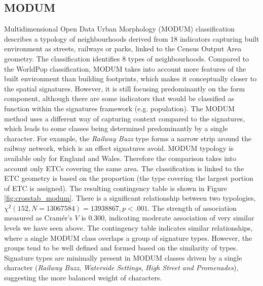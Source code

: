 \subsection*{MODUM}
Multidimensional Open Data Urban Morphology (MODUM) classification describes a typology
of neighbourhoods derived from 18 indicators capturing built environment as streets,
railways or parks, linked to the Census Output Area geometry. The classification
identifies 8 types of neighbourhoods.
Compared to the WorldPop classification, MODUM takes into account more features of
the built environment than building footprints, which makes it conceptually closer to the
spatial signatures. However, it is still focusing predominantly on the form component,
although there are some indicators that would be classified as function within the
signatures framework (e.g. population). The MODUM method uses a different way of
capturing context compared to the signatures, which leads to some classes being
determined predominantly by a single character. For example, the \textit{Railway Buzz} type
forms a narrow strip around the railway network, which is an effect signatures avoid.
MODUM typology is available only for England and Wales. Therefore the comparison takes
into account only ETCs covering the same area. The classification is linked to the
ETC geometry is based on the proportion (the type covering the largest portion of ETC is
assigned). The resulting contingency table is shown in Figure \ref{fig:crosstab_modum}. There is a
significant relationship between two typologies, $\chi^{2} (152, N = 13067584) =
13938867, p < .001$. The strength of association measured as Cramér's $V$ is $0.300$,
indicating moderate association of very similar levels we have seen above. The
contingency table indicates similar relationships, where a single MODUM class overlaps a
group of signature types. However, the groups tend to be well defined and formed based
on the similarity of types. Signature types are minimally present in MODUM classes driven
by a single character (\textit{Railway Buzz}, \textit{Waterside Settings},
\textit{High Street and Promenades}), suggesting the more balanced weight of characters.



